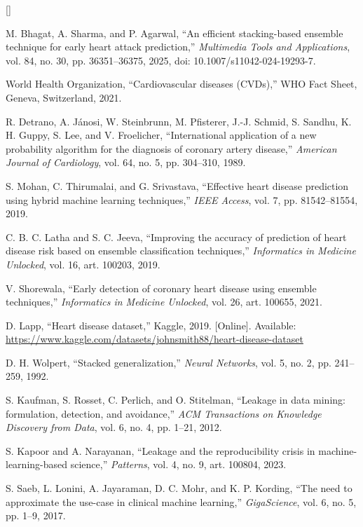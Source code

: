 \documentclass[11pt,a4paper]{article}
\newcounter{refcount}
\begin{document}
\begin{list}{[]}%
{\setlength{\leftmargin}{28pt}\setlength{\labelwidth}{22pt}%
 \setlength{\labelsep}{6pt}\setlength{\itemsep}{4pt}\setlength{\parsep}{0pt}}
\small
\item M. Bhagat, A. Sharma, and P. Agarwal, ``An efficient stacking-based ensemble technique for early heart attack prediction,'' \emph{Multimedia Tools and Applications}, vol. 84, no. 30, pp. 36351--36375, 2025, doi: 10.1007/s11042-024-19293-7.
\item World Health Organization, ``Cardiovascular diseases (CVDs),'' WHO Fact Sheet, Geneva, Switzerland, 2021.
\item R. Detrano, A. J\'anosi, W. Steinbrunn, M. Pfisterer, J.-J. Schmid, S. Sandhu, K. H. Guppy, S. Lee, and V. Froelicher, ``International application of a new probability algorithm for the diagnosis of coronary artery disease,'' \emph{American Journal of Cardiology}, vol. 64, no. 5, pp. 304--310, 1989.
\item S. Mohan, C. Thirumalai, and G. Srivastava, ``Effective heart disease prediction using hybrid machine learning techniques,'' \emph{IEEE Access}, vol. 7, pp. 81542--81554, 2019.
\item C. B. C. Latha and S. C. Jeeva, ``Improving the accuracy of prediction of heart disease risk based on ensemble classification techniques,'' \emph{Informatics in Medicine Unlocked}, vol. 16, art. 100203, 2019.
\item V. Shorewala, ``Early detection of coronary heart disease using ensemble techniques,'' \emph{Informatics in Medicine Unlocked}, vol. 26, art. 100655, 2021.
\item D. Lapp, ``Heart disease dataset,'' Kaggle, 2019. [Online]. Available: \url{https://www.kaggle.com/datasets/johnsmith88/heart-disease-dataset}
\item D. H. Wolpert, ``Stacked generalization,'' \emph{Neural Networks}, vol. 5, no. 2, pp. 241--259, 1992.
\item S. Kaufman, S. Rosset, C. Perlich, and O. Stitelman, ``Leakage in data mining: formulation, detection, and avoidance,'' \emph{ACM Transactions on Knowledge Discovery from Data}, vol. 6, no. 4, pp. 1--21, 2012.
\item S. Kapoor and A. Narayanan, ``Leakage and the reproducibility crisis in machine-learning-based science,'' \emph{Patterns}, vol. 4, no. 9, art. 100804, 2023.
\item S. Saeb, L. Lonini, A. Jayaraman, D. C. Mohr, and K. P. Kording, ``The need to approximate the use-case in clinical machine learning,'' \emph{GigaScience}, vol. 6, no. 5, pp. 1--9, 2017.

\end{list}
\end{document}
